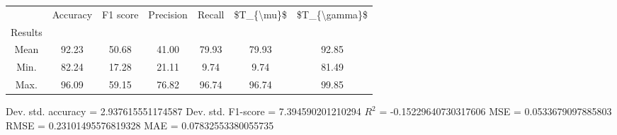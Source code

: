 \begin{tabular}{|c|c|c|c|c|c|c|}
\toprule
{} &  Accuracy &  F1 score &  Precision &  Recall &  \$T\_\{\textbackslash mu\}\$ &  \$T\_\{\textbackslash gamma\}\$ \\
Results &           &           &            &         &            &               \\
\hline
Mean    &     92.23 &     50.68 &      41.00 &   79.93 &      79.93 &         92.85 \\
Min.    &     82.24 &     17.28 &      21.11 &    9.74 &       9.74 &         81.49 \\
Max.    &     96.09 &     59.15 &      76.82 &   96.74 &      96.74 &         99.85 \\
\bottomrule
\end{tabular}

 Dev. std. accuracy = 2.937615551174587
 Dev. std. F1-score = 7.394590201210294
 $R^2$ = -0.15229640730317606
 MSE = 0.0533679097885803
 RMSE = 0.23101495576819328
 MAE = 0.07832553380055735